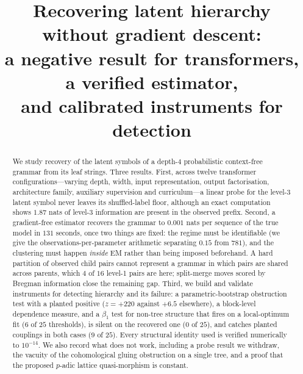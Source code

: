 \documentclass[11pt,a4paper]{article}
\title{Recovering latent hierarchy without gradient descent:\\
a negative result for transformers, a verified estimator,\\
and calibrated instruments for detection}
\author{}
\date{}
\theoremstyle{plain}
\theoremstyle{definition}
\begin{document}
\maketitle

\begin{abstract}
We study recovery of the latent symbols of a depth-$4$ probabilistic
context-free grammar from its leaf strings. Three results. First, across twelve
transformer configurations---varying depth, width, input representation, output
factorisation, architecture family, auxiliary supervision and
curriculum---a linear probe for the level-3 latent symbol never leaves its
shuffled-label floor, although an exact computation shows $1.87$ nats of
level-3 information are present in the observed prefix. Second, a gradient-free
estimator recovers the grammar to $0.001$ nats per sequence of the true model
in $131$ seconds, once two things are fixed: the regime must be identifiable
(we give the observations-per-parameter arithmetic separating $0.15$ from
$781$), and the clustering must happen \emph{inside} EM rather than being
imposed beforehand. A hard partition of observed child pairs cannot represent a
grammar in which pairs are shared across parents, which $4$ of $16$ level-1
pairs are here; split-merge moves scored by Bregman information close the
remaining gap. Third, we build and validate instruments for detecting
hierarchy and its failure: a parametric-bootstrap obstruction test with a
planted positive ($z=+220$ against $+6.5$ elsewhere), a block-level dependence
measure, and a $\beta_1$ test for non-tree structure that fires on a
local-optimum fit ($6$ of $25$ thresholds), is silent on the recovered one
($0$ of $25$), and catches planted couplings in both cases ($9$ of $25$).
Every structural identity used is verified numerically to $10^{-14}$. We also
record what does not work, including a probe result we withdraw, the vacuity of
the cohomological gluing obstruction on a single tree, and a proof that the
proposed $p$-adic lattice quasi-morphism is constant.
\end{abstract}

\tableofcontents
\bigskip

%
%      
\end{document}
